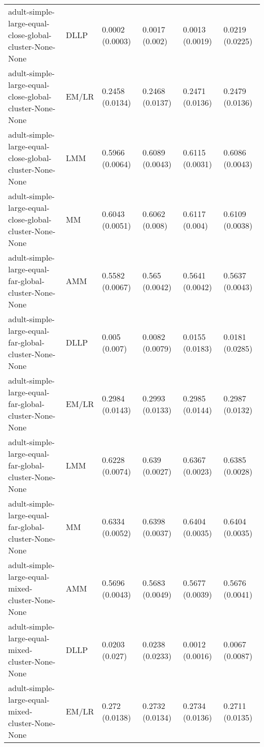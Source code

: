 \begin{longtable}{llllll}
                                adult-simple-large-equal-close-global-cluster-None-None &      DLLP & 0.0002 (0.0003) &   0.0017 (0.002) &   0.0013 (0.0019) &     0.0219 (0.0225) \\
                                adult-simple-large-equal-close-global-cluster-None-None &     EM/LR & 0.2458 (0.0134) &  0.2468 (0.0137) &   0.2471 (0.0136) &     0.2479 (0.0136) \\
                                adult-simple-large-equal-close-global-cluster-None-None &       LMM & 0.5966 (0.0064) &  0.6089 (0.0043) &   0.6115 (0.0031) &     0.6086 (0.0043) \\
                                adult-simple-large-equal-close-global-cluster-None-None &        MM & 0.6043 (0.0051) &   0.6062 (0.008) &    0.6117 (0.004) &     0.6109 (0.0038) \\
                                  adult-simple-large-equal-far-global-cluster-None-None &       AMM & 0.5582 (0.0067) &   0.565 (0.0042) &   0.5641 (0.0042) &     0.5637 (0.0043) \\
                                  adult-simple-large-equal-far-global-cluster-None-None &      DLLP &   0.005 (0.007) &  0.0082 (0.0079) &   0.0155 (0.0183) &     0.0181 (0.0285) \\
                                  adult-simple-large-equal-far-global-cluster-None-None &     EM/LR & 0.2984 (0.0143) &  0.2993 (0.0133) &   0.2985 (0.0144) &     0.2987 (0.0132) \\
                                  adult-simple-large-equal-far-global-cluster-None-None &       LMM & 0.6228 (0.0074) &   0.639 (0.0027) &   0.6367 (0.0023) &     0.6385 (0.0028) \\
                                  adult-simple-large-equal-far-global-cluster-None-None &        MM & 0.6334 (0.0052) &  0.6398 (0.0037) &   0.6404 (0.0035) &     0.6404 (0.0035) \\
                                       adult-simple-large-equal-mixed-cluster-None-None &       AMM & 0.5696 (0.0043) &  0.5683 (0.0049) &   0.5677 (0.0039) &     0.5676 (0.0041) \\
                                       adult-simple-large-equal-mixed-cluster-None-None &      DLLP &  0.0203 (0.027) &  0.0238 (0.0233) &   0.0012 (0.0016) &     0.0067 (0.0087) \\
                                       adult-simple-large-equal-mixed-cluster-None-None &     EM/LR &  0.272 (0.0138) &  0.2732 (0.0134) &   0.2734 (0.0136) &     0.2711 (0.0135) \\

\end{longtable}
